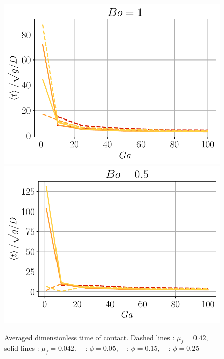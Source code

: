 \begin{figure}[h!]
    \centering
    \includegraphics[height=0.20\textheight]{image/N_10/time/Tcm_Bo_1.pdf}
    \includegraphics[height=0.20\textheight]{image/N_10/time/Tcm_Bo_0_5.pdf}
    \caption{Averaged dimensionless time of contact. Dashed lines : $\mu_f = 0.42$, solid lines : $\mu_f = 0.042$. \textcolor{red}{\textbf{--}} : $\phi = 0.05$, \textcolor{orange}{\textbf{--}} : $\phi = 0.15$, \textcolor{yellow}{\textbf{--}} : $\phi = 0.25$} 
    \label{fig:time_of_c}
\end{figure} 
